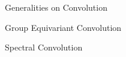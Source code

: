 \documentclass[../main.tex]{subfiles}
\begin{document}
    \begin{section}{Generalities on Convolution}
        \label{sec:3:1}
           
    \end{section}
    \begin{section}{Group Equivariant Convolution}
           
    \end{section}
    \begin{section}{Spectral Convolution}
           
    \end{section}
\end{document}
